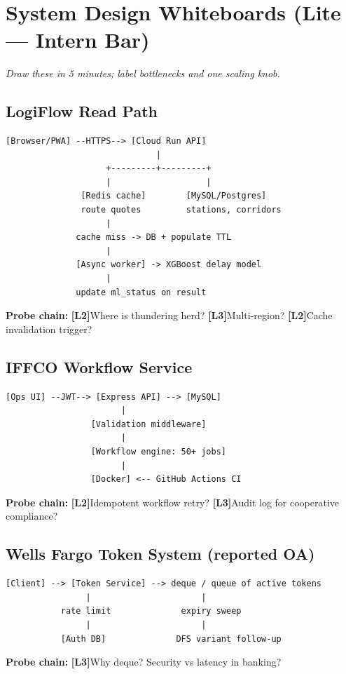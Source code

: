 \documentclass[9pt,a4paper]{article}
\newcommand{\diffLtwo}{\textcolor{orange!90!black}{\textbf{[L2]}}}
\newcommand{\diffLthree}{\textcolor{brutal}{\textbf{[L3]}}}
\begin{document}
\newpage
\section{System Design Whiteboards (Lite --- Intern Bar)}
\textit{Draw these in 5 minutes; label bottlenecks and one scaling knob.}

\subsection{LogiFlow Read Path}
\begin{verbatim}
[Browser/PWA] --HTTPS--> [Cloud Run API]
                              |
                    +---------+---------+
                    |                   |
               [Redis cache]        [MySQL/Postgres]
               route quotes         stations, corridors
                    |
              cache miss -> DB + populate TTL
                    |
              [Async worker] -> XGBoost delay model
                    |
              update ml_status on result
\end{verbatim}
\textbf{Probe chain:} \diffLtwo Where is thundering herd? \diffLthree Multi-region? \diffLtwo Cache invalidation trigger?

\subsection{IFFCO Workflow Service}
\begin{verbatim}
[Ops UI] --JWT--> [Express API] --> [MySQL]
                       |
                 [Validation middleware]
                       |
                 [Workflow engine: 50+ jobs]
                       |
                 [Docker] <-- GitHub Actions CI
\end{verbatim}
\textbf{Probe chain:} \diffLtwo Idempotent workflow retry? \diffLthree Audit log for cooperative compliance?

\subsection{Wells Fargo Token System (reported OA)}
\begin{verbatim}
[Client] --> [Token Service] --> deque / queue of active tokens
                |                      |
           rate limit              expiry sweep
                |                      |
           [Auth DB]              DFS variant follow-up
\end{verbatim}
\textbf{Probe chain:} \diffLthree Why deque? Security vs latency in banking?
\end{document}

